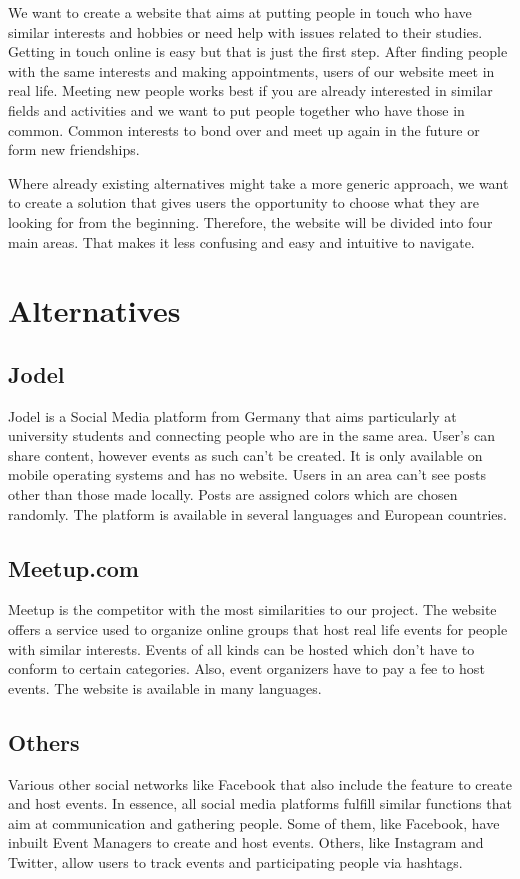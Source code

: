 \documentclass[conference]{IEEEtran}
\begin{document}
We want to create a website that aims at putting people in touch who have similar interests and hobbies or need help with issues related to their studies. Getting in touch online is easy but that is just the first step. After finding people with the same interests and making appointments, users of our website meet in real life. Meeting new people works best if you are already interested in similar fields and activities and we want to put people together who have those in common. Common interests to bond over and meet up again in the future or form new friendships.

Where already existing alternatives might take a more generic approach, we want to create a solution that gives users the opportunity to choose what they are looking for from the beginning. Therefore, the website will be divided into four main areas. That makes it less confusing and easy and intuitive to navigate.

\section{Alternatives}


\subsection{Jodel}

Jodel is a Social Media platform from Germany that aims particularly at university students and connecting people who are in the same area. User’s can share content, however events as such can’t be created. It is only available on mobile operating systems and has no website. Users in an area can’t see posts other than those made locally. Posts are assigned colors which are chosen randomly. The platform is available in several languages and European countries.

\subsection{Meetup.com}
 Meetup is the competitor with the most similarities to our project. The website offers a service used to organize online groups that host real life events for people with similar interests. Events of all kinds can be hosted which don’t have to conform to certain categories. Also, event organizers have to pay a fee to host events. The website is available in many languages.

\subsection{Others}
Various other social networks like Facebook that also include the feature to create and host events. In essence, all social media platforms fulfill similar functions that aim at communication and gathering people. Some of them, like Facebook, have inbuilt Event Managers to create and host events. Others, like Instagram and Twitter, allow users to track events and participating people via hashtags.
\end{document}
